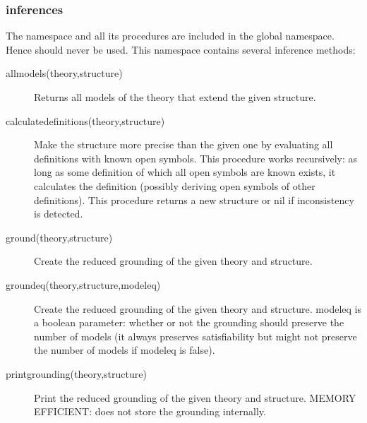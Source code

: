 \subsubsection{inferences}
The  namespace and all its procedures are included in the global namespace. Hence  should never be used. This namespace contains several inference methods:
\begin{description}
	\item[allmodels(theory,structure)] 
		Returns all models of the theory that extend the given structure.
	\item[calculatedefinitions(theory,structure)]
		Make the structure more precise than the given one by evaluating all definitions with known open symbols. This procedure works recursively: as long as some definition of which all open symbols are known exists, it calculates the definition (possibly deriving open symbols of other definitions). This procedure returns a new structure or  nil if inconsistency is detected.
	\item[ground(theory,structure)]
 		Create the reduced grounding of the given theory and structure. 
 	\item[groundeq(theory,structure,modeleq)]
 		Create the reduced grounding of the given theory and structure. modeleq is a boolean parameter:  whether or not the grounding should preserve the number of models (it always preserves satisfiability but might not preserve the number of models if modeleq is false).
 	\item[printgrounding(theory,structure)]
 		Print the reduced grounding of the given theory and structure.
 		MEMORY EFFICIENT: does not store the grounding internally.
 		

\end{description}
